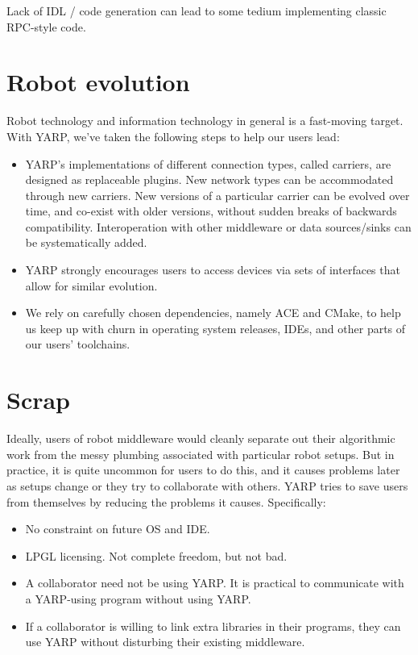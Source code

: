 \documentclass[letterpaper]{article}
\begin{document}
Lack of IDL / code generation can lead to some tedium
implementing classic RPC-style code.

\section{Robot evolution}

Robot technology and information technology in general is a
fast-moving target.  With YARP, we've taken the following steps to
help our users lead:

\begin{itemize}

\item YARP's implementations of different connection types, called
carriers, are designed as replaceable plugins.  New network types can
be accommodated through new carriers.  New versions of a particular
carrier can be evolved over time, and co-exist with older versions,
without sudden breaks of backwards compatibility.  Interoperation
with other middleware or data sources/sinks can be systematically
added.

\item YARP strongly encourages users to access devices via sets of
interfaces that allow for similar evolution.

\item We rely on carefully chosen dependencies, namely ACE and CMake,
to help us keep up with churn in operating system releases, IDEs, and
other parts of our users' toolchains.

\end{itemize}

\section{Scrap}


Ideally, users of robot middleware would cleanly separate out their
algorithmic work from the messy plumbing associated with particular
robot setups.  But in practice, it is quite uncommon for users to do
this, and it causes problems later as setups change or they try to
collaborate with others.  YARP tries to save users from themselves
by reducing the problems it causes.  Specifically:

\begin{itemize}

\item No constraint on future OS and IDE.

\item LPGL licensing.  Not complete freedom, but not bad.

\item A collaborator need not be using YARP.  It is practical to
communicate with a YARP-using program without using YARP.

\item If a collaborator is willing to link extra libraries in their
programs, they can use YARP without disturbing their existing
middleware.

\end{itemize}
\end{document}

